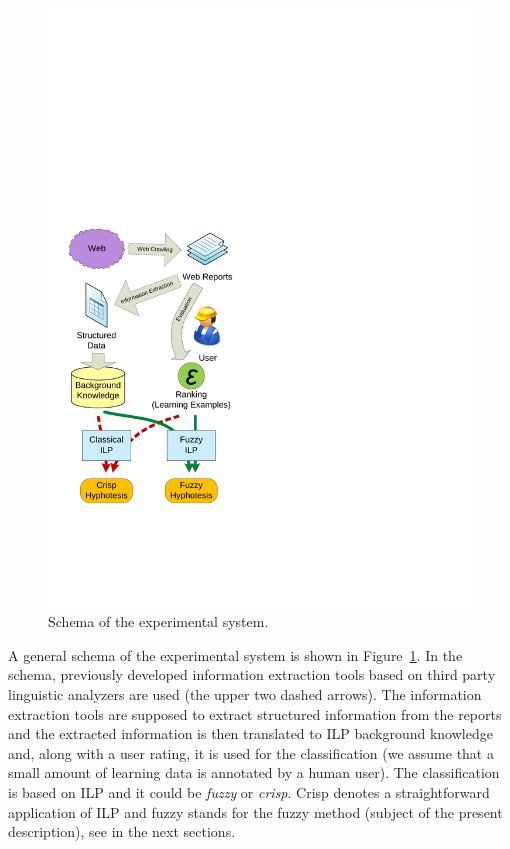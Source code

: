 \begin{figure}
\vspace{-0.75cm}
\centerline{\includegraphics[width=\hsize]{schema}}
\caption{Schema of the experimental system.}
\label{fig:schema}
\end{figure}


A general schema of the experimental system is shown in Figure~\ref{fig:schema}. In the schema, previously developed information extraction tools based on third party linguistic analyzers are used (the upper two dashed arrows). The information extraction tools are supposed to extract structured information from the reports and the extracted information is then translated to ILP background knowledge and, along with a user rating, it is used for the classification (we assume that a small amount of learning data is annotated by a human user). The classification is based on ILP and it could be \emph{fuzzy} or \emph{crisp}. Crisp denotes a straightforward application of ILP and fuzzy stands for the fuzzy method (subject of the present description), see in the next sections.


